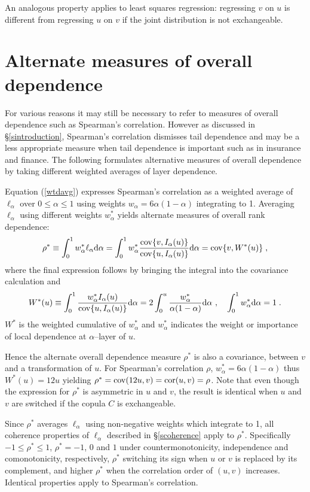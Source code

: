 \documentclass[authoryear]{elsarticle}
\newcommand{\cov}{{\rm cov}}
\newcommand{\cor}{\mathrm{cor}}
\newcommand{\de}{\mathrm{d}}
\newcommand{\cq}{\ ,\quad }
\newcommand{\eref}[1]{(\ref{#1})}
\newcommand{\sref}[1]{\S\ref{#1}}
\begin{document}
An analogous property applies to least squares regression: regressing $v$ on $u$ is different from regressing $u$ on $v$ if the joint distribution is not exchangeable.








\section{Alternate measures of overall dependence}\label{saltoverall}


For various reasons it may still be necessary to refer to measures of overall dependence such as Spearman's correlation. However as discussed in \sref{sintroduction}, Spearman's correlation dismisses tail dependence and may be a less appropriate measure when tail dependence is important such as in insurance and finance. The following formulates alternative measures of overall dependence by taking different weighted averages of layer dependence.


Equation \eref{wtdavg} expresses Spearman's correlation as a weighted average of $\ell_\alpha$ over $0\le\alpha\le 1$ using weights $w_\alpha=6\alpha(1-\alpha)$ integrating to 1. Averaging $\ell_\alpha$ using different weights $w^*_\alpha$ yields alternate measures of overall rank dependence:
$$
\rho^*\equiv  \int_0^1 w^*_\alpha \ell_\alpha \de \alpha
= \int_0^1 w^*_\alpha \frac{ \cov\{v,I_\alpha(u)\}}{\cov\{u,I_\alpha(u)\}} \de \alpha=\cov\{v,W^*(u)\} \;,
$$
where the final expression follows by bringing the integral into the covariance calculation and
$$
W^*(u)\equiv \int_0^1 \frac{w^*_\alpha I_\alpha(u)}{\cov\{u,I_\alpha(u)\}}\de\alpha
= 2\int_0^u \frac{w^*_\alpha }{\alpha(1-\alpha)}\de\alpha
\cq \int_0^1 w_\alpha^* \de\alpha=1 \;.
$$
$W^*$ is the weighted cumulative of $w^*_\alpha$ and $w_\alpha^*$ indicates the weight or importance of local dependence at $\alpha$--layer of $u$.

Hence the alternate overall dependence measure $\rho^*$ is also a covariance, between $v$ and a transformation of $u$. For Spearman's correlation $\rho$, $w^*_\alpha=6\alpha(1-\alpha)$ thus $W^*(u)=12u$ yielding $\rho^*=\cov(12u,v)=\cor(u,v)=\rho$. Note that even though the expression for $\rho^*$ is asymmetric in $u$ and $v$, the result is identical when $u$ and $v$ are switched if the copula $C$ is exchangeable.

Since $\rho^*$ averages $\ell_\alpha$ using non-negative weights which integrate to 1, all coherence properties of $\ell_\alpha$ described in \sref{scoherence} apply to $\rho^*$. Specifically $-1\le\rho^*\le 1$, $\rho^*=-1$, $0$ and $1$ under countermonotonicity, independence and comonotonicity, respectively, $\rho^*$ switching its sign when $u$ or $v$ is replaced by its complement, and higher $\rho^*$ when the correlation order of $(u,v)$ increases. Identical properties apply to Spearman's correlation.
\end{document}

